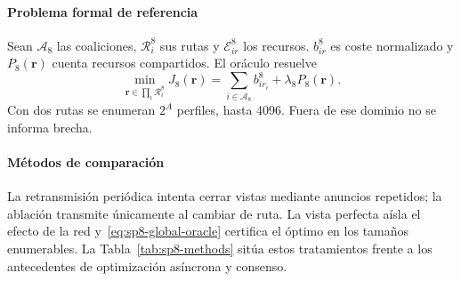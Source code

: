 \paragraph{Problema formal de referencia}

Sean $\mathcal A_8$ las coaliciones, $\mathcal R_i^8$ sus rutas y $\mathcal E_{ir}^8$ los recursos. $b_{ir}^8$ es coste normalizado y $P_8(\boldsymbol r)$ cuenta recursos compartidos. El oráculo resuelve
\begin{equation}
\label{eq:sp8-global-oracle}
 \min_{\boldsymbol r\in\prod_i\mathcal R_i^8}
 J_8(\boldsymbol r)
 =\sum_{i\in\mathcal A_8} b_{i r_i}^8+\lambda_8P_8(\boldsymbol r).
\end{equation}
Con dos rutas se enumeran $2^A$ perfiles, hasta 4096. Fuera de ese dominio no se informa brecha.

\paragraph{Métodos de comparación}

La retransmisión periódica intenta cerrar vistas mediante anuncios repetidos; la ablación transmite únicamente al cambiar de ruta. La vista perfecta aísla el efecto de la red y~\eqref{eq:sp8-global-oracle} certifica el óptimo en los tamaños enumerables. La Tabla~\ref{tab:sp8-methods} sitúa estos tratamientos frente a los antecedentes de optimización asíncrona y consenso.

